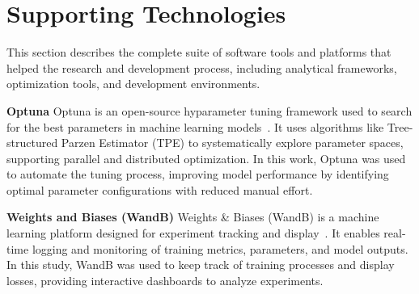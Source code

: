 


\section{Supporting Technologies}

This section describes the complete suite of software tools and platforms that helped the research and development process, including analytical frameworks, optimization tools, and development environments.

\textbf{Optuna}
\label{subsec:optuna}
Optuna is an open-source hyparameter tuning framework used to search for the best parameters in machine learning models~\cite{akiba_optuna_2019}. It uses algorithms like Tree-structured Parzen Estimator (TPE) to systematically explore parameter spaces, supporting parallel and distributed optimization. In this work, Optuna was used to automate the tuning process, improving model performance by identifying optimal parameter configurations with reduced manual effort.

\textbf{Weights and Biases (WandB)}
\label{subsec:wandb}
Weights \& Biases (WandB) is a machine learning platform designed for experiment tracking and display~\cite{noauthor_weights_nodate}. It enables real-time logging and monitoring of training metrics, parameters, and model outputs. In this study, WandB was used to keep track of training processes and display losses, providing interactive dashboards to analyze experiments.

